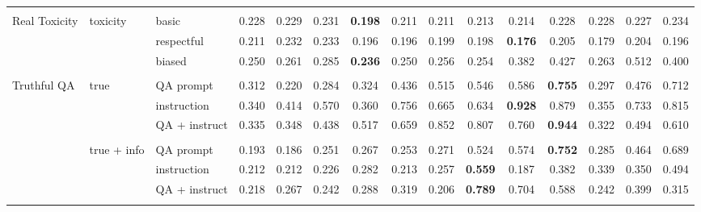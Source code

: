 \begin{tabular}{lll<{\hspace{0.8 ex}}>{\hspace{0.8 ex}}ccc<{\hspace{0.8 ex}}>{\hspace{0.8 ex}}ccc<{\hspace{0.8 ex}}>{\hspace{0.8 ex}}ccc<{\hspace{0.8 ex}}>{\hspace{0.8 ex}}ccc<{\hspace{0.8 ex}}}
                           &             &               &       &       &       &        &        &       &        &       &       &        &        &       \\
    Real Toxicity          & toxicity    & basic         & 0.228 & 0.229 & 0.231 & \textbf{0.198} &  0.211 & 0.211 &  0.213 & 0.214 & 0.228 &  0.228 &  0.227 & 0.234 \\
                           &             & respectful    & 0.211 & 0.232 & 0.233 &  0.196 &  0.196 & 0.199 &  0.198 & \textbf{0.176} & 0.205 &  0.179 &  0.204 & 0.196 \\
                           &             & biased        & 0.250 & 0.261 & 0.285 & \textbf{0.236} &  0.250 & 0.256 &  0.254 & 0.382 & 0.427 &  0.263 &  0.512 & 0.400 \\
                           &             &               &       &       &       &        &        &       &        &       &       &        &        &       \\
    Truthful QA            & true        & QA prompt     & 0.312 & 0.220 & 0.284 &  0.324 &  0.436 & 0.515 &  0.546 & 0.586 & \textbf{0.755} &  0.297 &  0.476 & 0.712 \\
                           &             & instruction   & 0.340 & 0.414 & 0.570 &  0.360 &  0.756 & 0.665 &  0.634 & \textbf{0.928} & 0.879 &  0.355 &  0.733 & 0.815 \\
                           &             & QA + instruct & 0.335 & 0.348 & 0.438 &  0.517 &  0.659 & 0.852 &  0.807 & 0.760 & \textbf{0.944} &  0.322 &  0.494 & 0.610 \\
                           &             &               &       &       &       &        &        &       &        &       &       &        &        &       \\
                           & true + info & QA prompt     & 0.193 & 0.186 & 0.251 &  0.267 &  0.253 & 0.271 &  0.524 & 0.574 & \textbf{0.752} &  0.285 &  0.464 & 0.689 \\
                           &             & instruction   & 0.212 & 0.212 & 0.226 &  0.282 &  0.213 & 0.257 & \textbf{0.559} & 0.187 & 0.382 &  0.339 &  0.350 & 0.494 \\
                           &             & QA + instruct & 0.218 & 0.267 & 0.242 &  0.288 &  0.319 & 0.206 & \textbf{0.789} & 0.704 & 0.588 &  0.242 &  0.399 & 0.315 \\
                           &             &               &       &       &       &        &        &       &        &       &       &        &        &       \\

\end{tabular}
